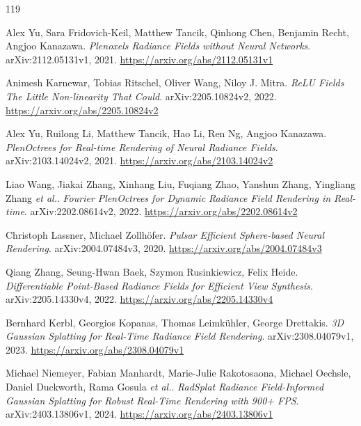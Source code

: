 \documentclass[11pt,a4paper]{article}
\begin{document}
\begin{thebibliography}{119}
\setlength{\itemsep}{2pt}

Alex Yu, Sara Fridovich-Keil, Matthew Tancik, Qinhong Chen, Benjamin Recht, Angjoo Kanazawa.
\newblock \emph{Plenoxels Radiance Fields without Neural Networks}.
\newblock arXiv:2112.05131v1, 2021.
\newblock \url{https://arxiv.org/abs/2112.05131v1}

Animesh Karnewar, Tobias Ritschel, Oliver Wang, Niloy J. Mitra.
\newblock \emph{ReLU Fields The Little Non-linearity That Could}.
\newblock arXiv:2205.10824v2, 2022.
\newblock \url{https://arxiv.org/abs/2205.10824v2}

Alex Yu, Ruilong Li, Matthew Tancik, Hao Li, Ren Ng, Angjoo Kanazawa.
\newblock \emph{PlenOctrees for Real-time Rendering of Neural Radiance Fields}.
\newblock arXiv:2103.14024v2, 2021.
\newblock \url{https://arxiv.org/abs/2103.14024v2}

Liao Wang, Jiakai Zhang, Xinhang Liu, Fuqiang Zhao, Yanshun Zhang, Yingliang Zhang \emph{et al.}.
\newblock \emph{Fourier PlenOctrees for Dynamic Radiance Field Rendering in Real-time}.
\newblock arXiv:2202.08614v2, 2022.
\newblock \url{https://arxiv.org/abs/2202.08614v2}

Christoph Lassner, Michael Zollh\"{o}fer.
\newblock \emph{Pulsar Efficient Sphere-based Neural Rendering}.
\newblock arXiv:2004.07484v3, 2020.
\newblock \url{https://arxiv.org/abs/2004.07484v3}

Qiang Zhang, Seung-Hwan Baek, Szymon Rusinkiewicz, Felix Heide.
\newblock \emph{Differentiable Point-Based Radiance Fields for Efficient View Synthesis}.
\newblock arXiv:2205.14330v4, 2022.
\newblock \url{https://arxiv.org/abs/2205.14330v4}

Bernhard Kerbl, Georgios Kopanas, Thomas Leimk\"{u}hler, George Drettakis.
\newblock \emph{3D Gaussian Splatting for Real-Time Radiance Field Rendering}.
\newblock arXiv:2308.04079v1, 2023.
\newblock \url{https://arxiv.org/abs/2308.04079v1}

Michael Niemeyer, Fabian Manhardt, Marie-Julie Rakotosaona, Michael Oechsle, Daniel Duckworth, Rama Gosula \emph{et al.}.
\newblock \emph{RadSplat Radiance Field-Informed Gaussian Splatting for Robust Real-Time Rendering with 900+ FPS}.
\newblock arXiv:2403.13806v1, 2024.
\newblock \url{https://arxiv.org/abs/2403.13806v1}


\end{thebibliography}
\end{document}
